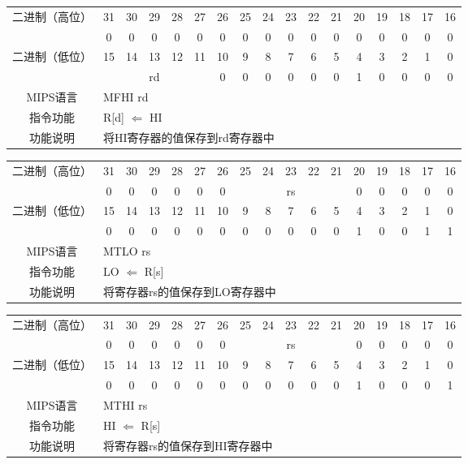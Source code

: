 \begin{table}
\begin{tabular}{|c|c|c|c|c|c|c|c|c|c|c|c|c|c|c|c|c|}
\hline
\multirow{2}{*}{二进制（高位）} &
31&30&29&28&27&26&25&24&23&22&21&20&19&18&17&16\\
\cline{2-17}
&0&0&0&0&0&0&0&0&0&0&0&0&0&0&0&0\\
\hline
\multirow{2}{*}{二进制（低位）} &
15&14&13&12&11&10&9&8&7&6&5&4&3&2&1&0\\
\cline{2-17}
&
\multicolumn{5}{c|}{rd}&
0&0&0&0&0&0&1&0&0&0&0\\
\hline
MIPS语言&
\multicolumn{16}{l|}{MFHI rd}\\
\hline
指令功能&
\multicolumn{16}{l|}{R[d] $\Leftarrow$ HI}\\
\hline
功能说明&
\multicolumn{16}{l|}{将HI寄存器的值保存到rd寄存器中}\\
\hline
\end{tabular}
\end{table}

\begin{table}
\begin{tabular}{|c|c|c|c|c|c|c|c|c|c|c|c|c|c|c|c|c|}
\hline
\multirow{2}{*}{二进制（高位）} &
31&30&29&28&27&26&25&24&23&22&21&20&19&18&17&16\\
\cline{2-17}
&
0&0&0&0&0&
0&
\multicolumn{5}{c|}{rs}&
0&0&0&0&0\\
\hline
\multirow{2}{*}{二进制（低位）} &
15&14&13&12&11&10&9&8&7&6&5&4&3&2&1&0\\
\cline{2-17}
&
0&0&0&0&0&
0&0&0&0&0&
0&1&0&0&1&
1\\
\hline
MIPS语言&
\multicolumn{16}{l|}{MTLO rs}\\
\hline
指令功能&
\multicolumn{16}{l|}{LO $\Leftarrow$ R[s]}\\
\hline
功能说明&
\multicolumn{16}{l|}{将寄存器rs的值保存到LO寄存器中}\\
\hline
\end{tabular}
\end{table}

\begin{table}
\begin{tabular}{|c|c|c|c|c|c|c|c|c|c|c|c|c|c|c|c|c|}
\hline
\multirow{2}{*}{二进制（高位）} &
31&30&29&28&27&26&25&24&23&22&21&20&19&18&17&16\\
\cline{2-17}
&
0&0&0&0&0&
0&
\multicolumn{5}{c|}{rs}&
0&0&0&0&0\\
\hline
\multirow{2}{*}{二进制（低位）} &
15&14&13&12&11&10&9&8&7&6&5&4&3&2&1&0\\
\cline{2-17}
&
0&0&0&0&0&
0&0&0&0&0&
0&1&0&0&0&
1\\
\hline
MIPS语言&
\multicolumn{16}{l|}{MTHI rs}\\
\hline
指令功能&
\multicolumn{16}{l|}{HI $\Leftarrow$ R[s]}\\
\hline
功能说明&
\multicolumn{16}{l|}{将寄存器rs的值保存到HI寄存器中}\\
\hline
\end{tabular}
\end{table}

